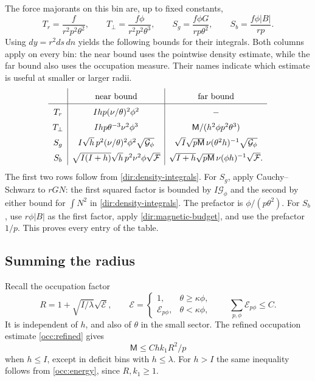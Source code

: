 The force majorants on this bin are, up to fixed constants,
\[
 T_r=\frac{f}{r^2p^2\theta^2},\qquad
 T_\perp=\frac{f\phi}{r^2p^2\theta^3},\qquad
 S_g=\frac{f\phi G}{rp\theta^2},\qquad
 S_b=\frac{f\phi|B|}{rp}.
\]
Using $dy=r^2ds\,dn$ yields the following bounds for their integrals.
Both columns apply on every bin: the near bound uses the pointwise density
estimate, while the far bound also uses the occupation measure. Their names
indicate which estimate is useful at smaller or larger radii.
\begin{equation}\label{dir:near-far}
\renewcommand{\arraystretch}{1.5}
\begin{array}{c|c|c}
 &\text{near bound}&\text{far bound}\\ \hline
 T_r&Ihp(\nu/\theta)^2\phi^2&-\\
 T_\perp&Ihp\theta^{-3}\nu^2\phi^3
         &\mathsf M/(h^2\phi p^2\theta^3)\\
 S_g&I\sqrt h\,p^2(\nu/\theta)^2\phi^2\sqrt{\mathcal G_\phi}
     &\sqrt I\sqrt{p\mathsf M}\,\nu(\theta^2h)^{-1}
        \sqrt{\mathcal G_\phi}\\
 S_b&\sqrt{I(I+h)}\sqrt h\,p^2\nu^2\phi\sqrt{\mathcal F}
     &\sqrt{I+h}\sqrt{p\mathsf M}\,\nu(\phi h)^{-1}
        \sqrt{\mathcal F}.
\end{array}
\end{equation}
The first two rows follow from \eqref{dir:density-integrals}.
For $S_g$, apply Cauchy--Schwarz to $rGN$: the first squared factor
is bounded by $I\mathcal G_\phi$ and the second by either bound for
$\int N^2$ in \eqref{dir:density-integrals}.  The prefactor is
$\phi/(p\theta^2)$.  For $S_b$, use $r\phi|B|$ as the first factor,
apply \eqref{dir:magnetic-budget}, and use the prefactor $1/p$.
This proves every entry of the table.

\subsection{Summing the radius}

Recall the occupation factor
\[
 R=1+\sqrt{I/\lambda}\sqrt{\mathcal E},
 \qquad
 \mathcal E=
 \begin{cases}
  1,&\theta\ge\kappa\phi,\\
  \mathcal E_{p\phi},&\theta<\kappa\phi,
 \end{cases}
 \qquad \sum_{p,\phi}\mathcal E_{p\phi}\le C.
\]
It is independent of $h$, and also of $\theta$ in the small sector.
The refined occupation estimate \eqref{occ:refined} gives
\begin{equation}\label{dir:occupation}
 \mathsf M\le C h k_1R^2/p
\end{equation}
when $h\le I$, except in deficit bins with $h\le\lambda$.
For $h>I$ the same inequality follows from \eqref{occ:energy},
since $R,k_1\ge1$.

